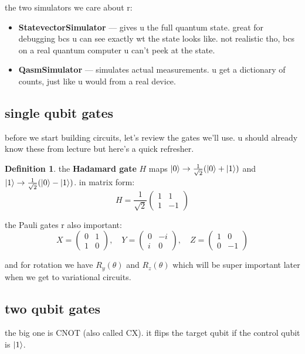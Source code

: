 \documentclass[11pt,a4paper]{article}
\theoremstyle{definition}
\newtheorem{definition}{Definition}[section]
\theoremstyle{remark}
\begin{document}
the two simulators we care about r:
\begin{itemize}[leftmargin=*]
  \item \textbf{StatevectorSimulator} --- gives u the full quantum state. great for debugging bcs u can see exactly wt the state looks like. not realistic tho, bcs on a real quantum computer u can't peek at the state.
  \item \textbf{QasmSimulator} --- simulates actual measurements. u get a dictionary of counts, just like u would from a real device.
\end{itemize}

\subsection{single qubit gates}

before we start building circuits, let's review the gates we'll use. u should already know these from lecture but here's a quick refresher.

\begin{definition}
the \textbf{Hadamard gate} $H$ maps $\ket{0} \to \frac{1}{\sqrt{2}}(\ket{0}+\ket{1})$ and $\ket{1} \to \frac{1}{\sqrt{2}}(\ket{0}-\ket{1})$. in matrix form:
\[
H = \frac{1}{\sqrt{2}}\begin{pmatrix} 1 & 1 \\ 1 & -1 \end{pmatrix}
\]
\end{definition}

the Pauli gates r also important:
\[
X = \begin{pmatrix} 0 & 1 \\ 1 & 0 \end{pmatrix}, \quad
Y = \begin{pmatrix} 0 & -i \\ i & 0 \end{pmatrix}, \quad
Z = \begin{pmatrix} 1 & 0 \\ 0 & -1 \end{pmatrix}
\]

and for rotation we have $R_y(\theta)$ and $R_z(\theta)$ which will be super important later when we get to variational circuits.

\subsection{two qubit gates}

the big one is CNOT (also called CX). it flips the target qubit if the control qubit is $\ket{1}$.
\end{document}
